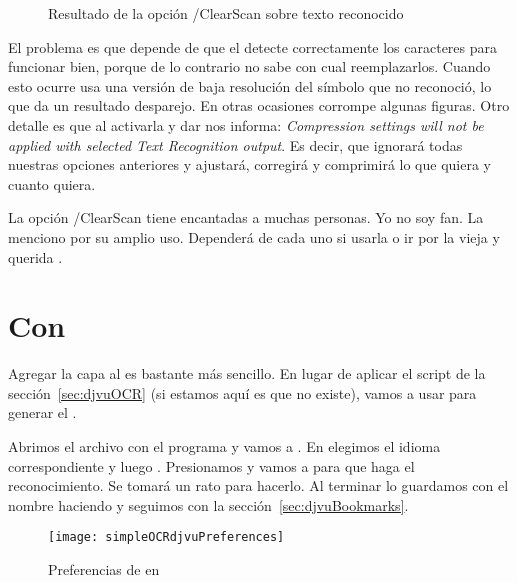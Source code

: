 \documentclass[%
	a5paper,
	10pt,
	twoside,
	openright,
	final,
]{memoir}
\begin{document}
	\begin{figure}
		\caption[Resultado de la opción /ClearScan]{Resultado de la opción /ClearScan sobre texto reconocido\label{fig:simpleOCRpdfEnhanceGoodExamples}}
	\end{figure}

	El problema es que depende de que el \ocr detecte correctamente los caracteres para funcionar bien, porque de lo contrario no sabe con cual reemplazarlos. Cuando esto ocurre usa una versión de baja resolución del símbolo que no reconoció, lo que da un resultado desparejo. En otras ocasiones corrompe algunas figuras. Otro detalle es que al activarla y dar  \acrobat nos informa: \emph{Compression settings will not be applied with selected Text Recognition output}. Es decir, que ignorará todas nuestras opciones anteriores y ajustará, corregirá y comprimirá lo que quiera y cuanto quiera.

	La opción /ClearScan tiene encantadas a muchas personas. Yo no soy fan. La menciono por su amplio uso. Dependerá de cada uno si usarla o ir por la vieja y querida .

	\section{Con \djvueditor} Agregar la capa al \djvu es bastante más sencillo. En lugar de aplicar el script de la sección~\ref{sec:djvuOCR} (si estamos aquí es que no existe), vamos a usar \djvueditor para generar el \ocr.

	Abrimos el archivo  con el programa y vamos a . En  elegimos el idioma correspondiente y luego . Presionamos  y vamos a  para que haga el reconocimiento. Se tomará un rato para hacerlo. Al terminar lo guardamos con el nombre  haciendo  y seguimos con la sección~\ref{sec:djvuBookmarks}.

	\begin{figure}
		\texttt{[image: simpleOCRdjvuPreferences]}
		\caption{Preferencias de \ocr en \djvueditor\label{fig:simpleOCRdjvuPreferences}}
	\end{figure}
\end{document}
